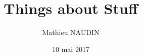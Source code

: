 
\makeatletter
\title{Things about Stuff}\let\Title\@title
\author{Mathieu NAUDIN}   \let\Author\@author
\date{10 mai 2017}        \let\DateSoutenance\@date
\makeatother